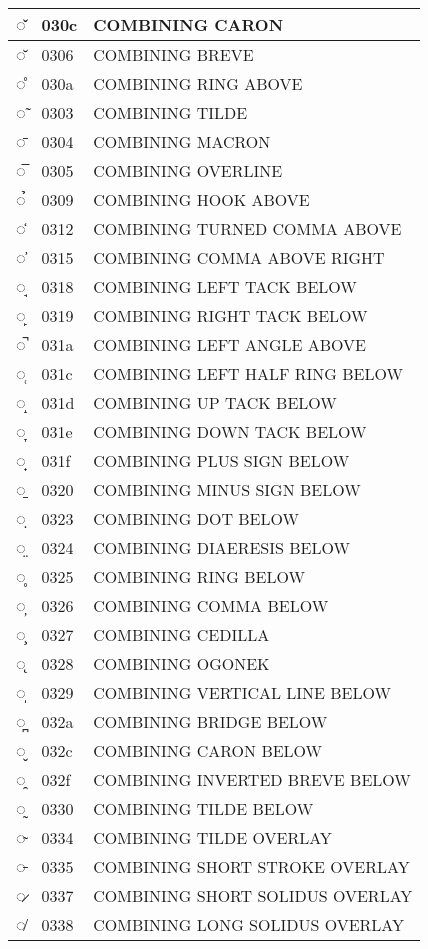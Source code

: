 \documentclass[12pt,letterpaper,openany]{book}
\begin{document}
\begin{center}
\begin{supertabular}{|m{0.25in}|m{0.5in}|m{4in}|}
◌̌ & 030c & COMBINING CARON\\\hline
◌̆ & 0306 & COMBINING BREVE\\\hline
◌̊ & 030a & COMBINING RING ABOVE\\\hline
◌̃ & 0303 & COMBINING TILDE\\\hline
◌̄ & 0304 & COMBINING MACRON\\\hline
◌̅ & 0305 & COMBINING OVERLINE\\\hline
◌̉ & 0309 & COMBINING HOOK ABOVE\\\hline
◌̒ & 0312 & COMBINING TURNED COMMA ABOVE\\\hline
◌̕ & 0315 & COMBINING COMMA ABOVE RIGHT\\\hline
◌̘ & 0318 & COMBINING LEFT TACK BELOW\\\hline
◌̙ & 0319 & COMBINING RIGHT TACK BELOW\\\hline
◌̚ & 031a & COMBINING LEFT ANGLE ABOVE\\\hline
◌̜ & 031c & COMBINING LEFT HALF RING BELOW\\\hline
◌̝ & 031d & COMBINING UP TACK BELOW\\\hline
◌̞ & 031e & COMBINING DOWN TACK BELOW\\\hline
◌̟ & 031f & COMBINING PLUS SIGN BELOW\\\hline
◌̠ & 0320 & COMBINING MINUS SIGN BELOW\\\hline
◌̣ & 0323 & COMBINING DOT BELOW\\\hline
◌̤ & 0324 & COMBINING DIAERESIS BELOW\\\hline
◌̥ & 0325 & COMBINING RING BELOW\\\hline
◌̦ & 0326 & COMBINING COMMA BELOW\\\hline
◌̧ & 0327 & COMBINING CEDILLA\\\hline
◌̨ & 0328 & COMBINING OGONEK\\\hline
◌̩ & 0329 & COMBINING VERTICAL LINE BELOW\\\hline
◌̪ & 032a & COMBINING BRIDGE BELOW\\\hline
◌̬ & 032c & COMBINING CARON BELOW\\\hline
◌̯ & 032f & COMBINING INVERTED BREVE BELOW\\\hline
◌̰ & 0330 & COMBINING TILDE BELOW\\\hline
◌̴ & 0334 & COMBINING TILDE OVERLAY\\\hline
◌̵ & 0335 & COMBINING SHORT STROKE OVERLAY\\\hline
◌̷ & 0337 & COMBINING SHORT SOLIDUS OVERLAY\\\hline
◌̸ & 0338 & COMBINING LONG SOLIDUS OVERLAY\\\hline

\end{supertabular}
\end{center}
\end{document}
